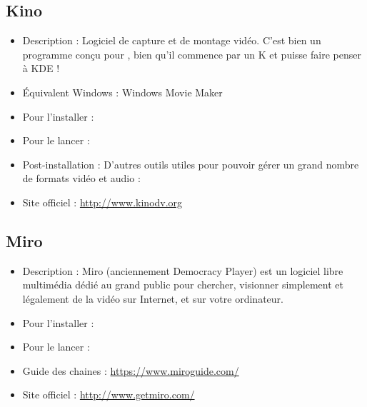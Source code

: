 \subsection{Kino}
\begin{itemize}
\begingroup
{}
\item Description : Logiciel de capture et de montage vidéo. C'est bien un programme conçu pour , bien qu'il commence par un K et puisse faire penser à KDE !{\par}
\endgroup
\item Équivalent Windows : Windows Movie Maker{\par}
\item Pour l'installer : 
\item Pour le lancer : 
\item Post-installation : D'autres outils utiles pour pouvoir gérer un grand nombre de formats vidéo et audio : 
\item Site officiel : \url{http://www.kinodv.org}{\par}
\end{itemize}
\subsection{Miro}
\begin{itemize}
\begingroup
{}
\item Description : Miro (anciennement Democracy Player) est un logiciel libre multimédia dédié au grand public pour chercher, visionner simplement et légalement de la vidéo sur Internet, et sur votre ordinateur.{\par}
\item Pour l'installer : 
\item Pour le lancer : 
\item Guide des chaines : \url{https://www.miroguide.com/}{\par}
\item Site officiel : \url{http://www.getmiro.com/}{\par}
\endgroup
\end{itemize}

